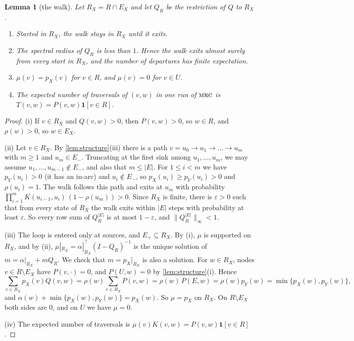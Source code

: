 \documentclass[11pt]{article}
\newtheorem{lemma}[theorem]{Lemma}
\theoremstyle{definition}
\newcommand{\pX}{p_X}
\newcommand{\pY}{p_Y}
\newcommand{\Ep}{E_{+}}
\newcommand{\Em}{E_{-}}
\newcommand{\one}{\mathbf{1}}
\newcommand{\MRC}{\textnormal{\textsc{mrc}}}
\begin{document}
\begin{lemma}[the walk]\label{lem:walk}
Let $R_X=R\cap E_X$ and let $Q_R$ be the restriction of $Q$ to $R_X$.
\begin{enumerate}[label=(\roman*)]
  \item Started in $R_X$, the walk stays in $R_X$ until it exits.
  \item The spectral radius of $Q_R$ is less than $1$. Hence the walk exits almost surely from every start in $R_X$, and the number of departures has finite expectation.
  \item $\mu(v)=\pX(v)$ for $v\in R$, and $\mu(v)=0$ for $v\in U$.
  \item The expected number of traversals of $(v,w)$ in one run of $\MRC$ is $T(v,w)=P(v,w)\one[v\in R]$.
\end{enumerate}
\end{lemma}
\begin{proof}
(i) If $v\in R_X$ and $Q(v,w)>0$, then $P(v,w)>0$, so $w\in R$, and $\rho(w)>0$,
so $w\in E_X$.

(ii) Let $v\in R_X$. By \cref{lem:structure}(iii) there is a path
$v=u_0\to u_1\to\dots\to u_m$ with $m\ge1$ and $u_m\in\Em$. Truncating at the
first sink among $u_1,\dots,u_m$, we may assume $u_1,\dots,u_{m-1}\notin\Em$, and
also that $m\le|E|$. For $1\le i<m$ we have $\pY(u_i)>0$ (it has an in-arc) and
$u_i\notin\Em$, so $\pX(u_i)\ge\pY(u_i)>0$ and $\rho(u_i)=1$. The walk follows
this path and exits at $u_m$ with probability
$\prod_{i=1}^{m}K(u_{i-1},u_i)\,(1-\rho(u_m))>0$. Since $R_X$ is finite, there is
$\varepsilon>0$ such that from every state of $R_X$ the walk exits within $|E|$
steps with probability at least $\varepsilon$. So every row sum of $Q_R^{|E|}$
is at most $1-\varepsilon$, and $\|Q_R^{|E|}\|_\infty<1$.

(iii) The loop is entered only at sources, and $\Ep\subseteq R_X$. By (i), $\mu$
is supported on $R_X$, and by (ii),
$\mu|_{R_X}=\alpha|_{R_X}^{\top}(I-Q_R)^{-1}$ is the unique solution of
$m=\alpha|_{R_X}+mQ_R$. We check that $m=\pX|_{R_X}$ is also a solution. For
$w\in R_X$, nodes $v\in R\setminus E_X$ have $P(v,\cdot)=0$, and $P(U,w)=0$ by
\cref{lem:structure}(i). Hence
\[
  \sum_{v\in R_X}\pX(v)Q(v,w)=\rho(w)\sum_{v\in R_X}P(v,w)=\rho(w)\,P(E,w)=\rho(w)\pY(w)=\min\{\pX(w),\pY(w)\},
\]
and $\alpha(w)+\min\{\pX(w),\pY(w)\}=\pX(w)$. So $\mu=\pX$ on $R_X$. On
$R\setminus E_X$ both sides are $0$, and on $U$ we have $\mu=0$.

(iv) The expected number of traversals is $\mu(v)K(v,w)=P(v,w)\one[v\in R]$.
\end{proof}
\end{document}
